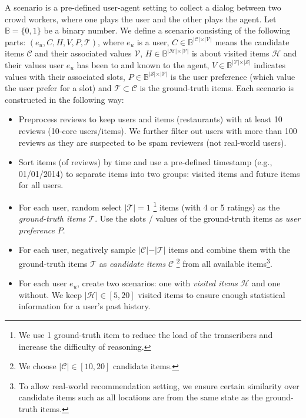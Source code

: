 A scenario is a pre-defined user-agent setting to collect a dialog between two crowd workers, where one plays the user and the other plays the agent.
Let $\mathbb{B}=\{0, 1\}$ be a binary number.
We define a scenario consisting of the following parts: $(e_u, C, H, V, P, \mathcal{T} )$, where $e_u$ is a user, $C \in \mathbb{B}^{\vert \mathcal{C} \vert \times \vert \mathcal{V} \vert}$ means the candidate items $\mathcal{C}$ and their associated values $\mathcal{V}$, $H \in \mathbb{B}^{\vert \mathcal{H} \vert \times \vert \mathcal{V} \vert}$ is about visited items $\mathcal{H}$ and their values user $e_u$ has been to and known to the agent, $V \in \mathbb{B}^{\vert \mathcal{V} \vert \times \vert \mathcal{S} \vert}$ indicates values with their associated slots, $P \in \mathbb{B}^{\vert \mathcal{S} \vert \times \vert \mathcal{V} \vert} $ is the user preference (which value the user prefer for a slot) and $\mathcal{T} \subset \mathcal{C}$ is the ground-truth items. 
Each scenario is constructed in the following way:
\begin{itemize}
\setlength\itemsep{0.1em}
    \item Preprocess reviews to keep users and items (restaurants) with at least 10 reviews (10-core users/items). 
    We further filter out users with more than 100 reviews as they are suspected to be spam reviewers (not real-world users).
    \item Sort items (of reviews) by time and use a pre-defined timestamp (e.g.,  01/01/2014) to separate items into two groups: visited items and future items for all users.
    \item For each user, random select $\vert \mathcal{T} \vert = 1$ \footnote{We use 1 ground-truth item to reduce the load of the transcribers and increase the difficulty of reasoning.} items (with 4 or 5 ratings) as the \textit{ground-truth items} $\mathcal{T}$. Use the slots / values of the ground-truth items as \textit{user preference} $P$.
    \item For each user, negatively sample $\vert \mathcal{C} \vert - \vert \mathcal{T} \vert $ items and combine them with the ground-truth items $\mathcal{T}$ as \textit{candidate items} $\mathcal{C}$ \footnote{We choose $\vert \mathcal{C} \vert \in [10, 20]$ candidate items.} from all available items\footnote{To allow real-world recommendation setting, we ensure certain similarity over candidate items such as all locations are from the same state as the ground-truth items.}.
    \item For each user $e_u$, create two scenarios: one with \textit{visited items} $\mathcal{H}$ and one without. We keep $\vert \mathcal{H} \vert \in [5, 20]$ visited items to ensure enough statistical information for a user's past history.
\end{itemize}

